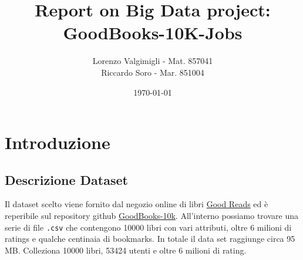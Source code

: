 \documentclass[11pt]{article}
\title{\textbf{Report on Big Data project: GoodBooks-10K-Jobs}}
\author{
Lorenzo Valgimigli - Mat. 857041\\
Riccardo Soro - Mar. 851004}
\date{\today}
\begin{document}
\maketitle
\newpage

\tableofcontents

\newpage

\section{Introduzione}
\subsection{Descrizione Dataset}

Il dataset scelto viene fornito dal negozio online di libri \href{https://www.goodreads.com/}{Good Reads} ed è
reperibile sul repository github \href{https://github.com/zygmuntz/goodbooks-10k}{GoodBooks-10k}.
All'interno possiamo trovare una serie di file \texttt{.csv} che contengono 10000 libri con vari attributi,
oltre 6 milioni di ratings e qualche centinaia di bookmarks.
In totale il data set raggiunge circa 95 MB. Colleziona 10000 libri, 53424 utenti e
oltre 6 milioni di rating.
\end{document}
